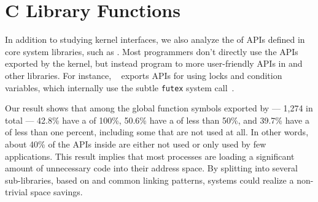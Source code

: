 


\section{C Library Functions}
\label{sec:study:libc}

In addition to studying kernel interfaces, we also analyze the \usagemetric{} of APIs
defined in core system libraries, such as \libc{}.
Most programmers don't directly use the APIs exported by the kernel,
but instead program to more user-friendly APIs in \libc{} and other libraries.
For instance, \glibc{}~\citep{glibc} exports APIs for using locks and condition variables, which internally 
use the subtle {\tt futex} system call~\citep{franke02futex}.

Our result shows that among %
the global function symbols exported by 
\libc{} --- 1,274 in total %
--- 42.8\% have a \usagemetric{} of 100\%,
50.6\% have a \usagemetric{} of less than 50\%,
and 39.7\% have a \usagemetric{} of less than one percent, including some that are not used at all.
In other words, about 40\% of the APIs inside \libc{}
are either not used or only used by few applications.
This result implies that most processes are loading a significant amount of 
unnecessary code into their address space.
By splitting \libc{} into several sub-libraries, based on \usagemetric{}
and common linking patterns, systems could realize a non-trivial space savings.

